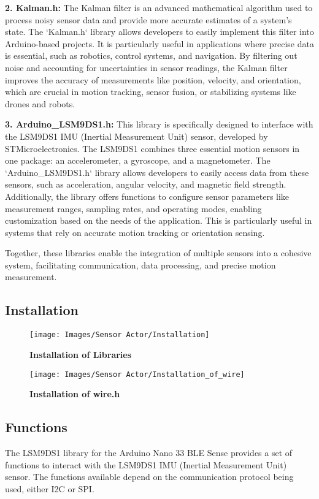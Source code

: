 \textbf{2. Kalman.h:}
   The Kalman filter is an advanced mathematical algorithm used to process noisy sensor data and provide more accurate estimates of a system’s state. The `Kalman.h` library allows developers to easily implement this filter into Arduino-based projects. It is particularly useful in applications where precise data is essential, such as robotics, control systems, and navigation. By filtering out noise and accounting for uncertainties in sensor readings, the Kalman filter improves the accuracy of measurements like position, velocity, and orientation, which are crucial in motion tracking, sensor fusion, or stabilizing systems like drones and robots.\cite{Passaro:2017}

\textbf{3. Arduino\_LSM9DS1.h:}
   This library is specifically designed to interface with the LSM9DS1 IMU (Inertial Measurement Unit) sensor, developed by STMicroelectronics. The LSM9DS1 combines three essential motion sensors in one package: an accelerometer, a gyroscope, and a magnetometer. The `Arduino\_LSM9DS1.h` library allows developers to easily access data from these sensors, such as acceleration, angular velocity, and magnetic field strength. Additionally, the library offers functions to configure sensor parameters like measurement ranges, sampling rates, and operating modes, enabling customization based on the needs of the application. This is particularly useful in systems that rely on accurate motion tracking or orientation sensing.\cite{Passaro:2017}

Together, these libraries enable the integration of multiple sensors into a cohesive system, facilitating communication, data processing, and precise motion measurement.

\subsection{Installation}
\begin{figure}[H]\centering
	\texttt{[image: Images/Sensor Actor/Installation]} 
	\caption{\textbf{Installation of Libraries}}
	\label{fig:Pin_assignment_of_Arduino_Nano_33_BLE_Sense} 
\end{figure}
\begin{figure}[H]\centering
	\texttt{[image: Images/Sensor Actor/Installation\_of\_wire]} 
	\caption{\textbf{Installation of wire.h}}
	\label{fig:Pin_assignment_of_Arduino_Nano_33_BLE_Sense} 
\end{figure}
\subsection{Functions}
The LSM9DS1 library for the Arduino Nano 33 BLE Sense provides a set of functions to interact with the LSM9DS1 IMU (Inertial Measurement Unit) sensor. The functions available depend on the communication protocol being used, either I2C or SPI.\cite{Passaro:2017}



